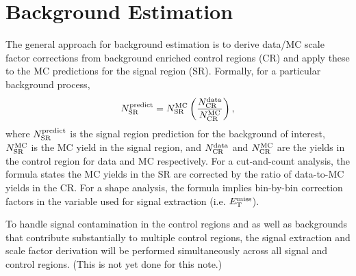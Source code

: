\section{Background Estimation}
\label{sec:background}

The general approach for background estimation is to derive data/MC scale factor corrections from background enriched control regions (CR) and apply these to the MC predictions for the signal region (SR). Formally, for a particular background process,
\begin{equation}
  N_{\mbox{\scriptsize{SR}}}^{\mbox{\scriptsize{predict}}} = N_{\mbox{\scriptsize{SR}}}^{\mbox{\scriptsize{MC}}}
\left(\frac{N_{\mbox{\scriptsize{CR}}}^{\mbox{\scriptsize{data}}}}{N_{\mbox{\scriptsize{CR}}}^{\mbox{\scriptsize{MC}}}}\right),
\end{equation}
where $N_{\mbox{\scriptsize{SR}}}^{\mbox{\scriptsize{predict}}}$ is the signal region prediction for the background of interest, $N_{\mbox{\scriptsize{SR}}}^{\mbox{\scriptsize{MC}}}$ is the MC yield in the signal region, and $N_{\mbox{\scriptsize{CR}}}^{\mbox{\scriptsize{data}}}$ and $N_{\mbox{\scriptsize{CR}}}^{\mbox{\scriptsize{MC}}}$ are the yields in the control region for data and MC respectively. For a cut-and-count analysis, the formula states the MC yields in the SR are corrected by the ratio of data-to-MC yields in the CR. For a shape analysis, the formula implies bin-by-bin correction factors in the variable used for signal extraction (i.e. $E_\mathrm{T}^{\mathrm{miss}}$).

To handle signal contamination in the control regions and as well as backgrounds that contribute substantially to multiple control regions, the signal extraction and scale factor derivation will be performed simultaneously across all signal and control regions. (This is not yet done for this note.)



